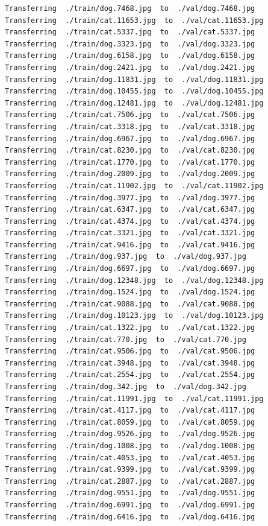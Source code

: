 \documentclass[]{book}
\theoremstyle{definition}
\theoremstyle{definition}
\theoremstyle{definition}
\theoremstyle{remark}
\begin{document}
\begin{verbatim}
Transferring  ./train/dog.7468.jpg  to  ./val/dog.7468.jpg
Transferring  ./train/cat.11653.jpg  to  ./val/cat.11653.jpg
Transferring  ./train/cat.5337.jpg  to  ./val/cat.5337.jpg
Transferring  ./train/dog.3323.jpg  to  ./val/dog.3323.jpg
Transferring  ./train/dog.6158.jpg  to  ./val/dog.6158.jpg
Transferring  ./train/dog.2421.jpg  to  ./val/dog.2421.jpg
Transferring  ./train/dog.11831.jpg  to  ./val/dog.11831.jpg
Transferring  ./train/dog.10455.jpg  to  ./val/dog.10455.jpg
Transferring  ./train/dog.12481.jpg  to  ./val/dog.12481.jpg
Transferring  ./train/cat.7506.jpg  to  ./val/cat.7506.jpg
Transferring  ./train/cat.3318.jpg  to  ./val/cat.3318.jpg
Transferring  ./train/dog.6967.jpg  to  ./val/dog.6967.jpg
Transferring  ./train/cat.8230.jpg  to  ./val/cat.8230.jpg
Transferring  ./train/cat.1770.jpg  to  ./val/cat.1770.jpg
Transferring  ./train/dog.2009.jpg  to  ./val/dog.2009.jpg
Transferring  ./train/cat.11902.jpg  to  ./val/cat.11902.jpg
Transferring  ./train/dog.3977.jpg  to  ./val/dog.3977.jpg
Transferring  ./train/cat.6347.jpg  to  ./val/cat.6347.jpg
Transferring  ./train/cat.4374.jpg  to  ./val/cat.4374.jpg
Transferring  ./train/cat.3321.jpg  to  ./val/cat.3321.jpg
Transferring  ./train/cat.9416.jpg  to  ./val/cat.9416.jpg
Transferring  ./train/dog.937.jpg  to  ./val/dog.937.jpg
Transferring  ./train/dog.6697.jpg  to  ./val/dog.6697.jpg
Transferring  ./train/dog.12348.jpg  to  ./val/dog.12348.jpg
Transferring  ./train/dog.1524.jpg  to  ./val/dog.1524.jpg
Transferring  ./train/cat.9088.jpg  to  ./val/cat.9088.jpg
Transferring  ./train/dog.10123.jpg  to  ./val/dog.10123.jpg
Transferring  ./train/cat.1322.jpg  to  ./val/cat.1322.jpg
Transferring  ./train/cat.770.jpg  to  ./val/cat.770.jpg
Transferring  ./train/cat.9506.jpg  to  ./val/cat.9506.jpg
Transferring  ./train/cat.3948.jpg  to  ./val/cat.3948.jpg
Transferring  ./train/cat.2554.jpg  to  ./val/cat.2554.jpg
Transferring  ./train/dog.342.jpg  to  ./val/dog.342.jpg
Transferring  ./train/cat.11991.jpg  to  ./val/cat.11991.jpg
Transferring  ./train/cat.4117.jpg  to  ./val/cat.4117.jpg
Transferring  ./train/cat.8059.jpg  to  ./val/cat.8059.jpg
Transferring  ./train/dog.9526.jpg  to  ./val/dog.9526.jpg
Transferring  ./train/dog.1008.jpg  to  ./val/dog.1008.jpg
Transferring  ./train/cat.4053.jpg  to  ./val/cat.4053.jpg
Transferring  ./train/cat.9399.jpg  to  ./val/cat.9399.jpg
Transferring  ./train/cat.2887.jpg  to  ./val/cat.2887.jpg
Transferring  ./train/dog.9551.jpg  to  ./val/dog.9551.jpg
Transferring  ./train/dog.6991.jpg  to  ./val/dog.6991.jpg
Transferring  ./train/dog.6416.jpg  to  ./val/dog.6416.jpg

\end{verbatim}
\end{document}
